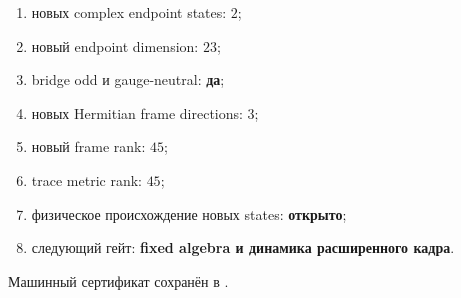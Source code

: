 \begin{protocol}\begin{enumerate}
\item новых complex endpoint states: \textbf{$2$};
\item новый endpoint dimension: \textbf{$23$};
\item bridge odd и gauge-neutral: \textbf{да};
\item новых Hermitian frame directions: \textbf{$3$};
\item новый frame rank: \textbf{$45$};
\item trace metric rank: \textbf{$45$};
\item физическое происхождение новых states: \textbf{открыто};
\item следующий гейт: \textbf{fixed algebra и динамика расширенного кадра}.
\end{enumerate}\end{protocol}

Машинный сертификат сохранён в
.